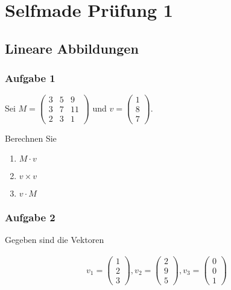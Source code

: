 \chapter{Selfmade Prüfung 1}

\section{Lineare Abbildungen}

\subsection{Aufgabe 1}

Sei $M = \begin{pmatrix}
        3 & 5 & 9  \\
        3 & 7 & 11 \\
        2 & 3 & 1
    \end{pmatrix}$ und $v = \begin{pmatrix}
        1 \\ 8 \\ 7
    \end{pmatrix}$.

Berechnen Sie
\begin{enumerate}
    \item $M \cdot v$
    \item $v \times v$
    \item $v \cdot M$
\end{enumerate}

\subsection{Aufgabe 2}

Gegeben sind die Vektoren

\begin{align*}
    v_1 = \begin{pmatrix}
              1 \\ 2 \\ 3
          \end{pmatrix}, v_2 = \begin{pmatrix}
                                   2 \\ 9 \\ 5
                               \end{pmatrix}, v_3 = \begin{pmatrix}
                                                        0 \\ 0 \\ 1
                                                    \end{pmatrix}
\end{align*}

